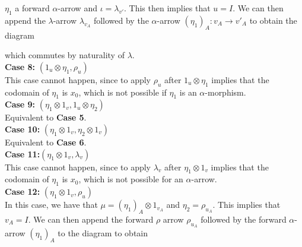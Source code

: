 \begin{varprf}
    $\eta_1$ a forward $\alpha$-arrow and $\iota = \lambda_{v'}$. 
    This then implies that $u = I$. 
    We can then append the $\lambda$-arrow $\lambda_{v_A}$ followed 
    by the $\alpha$-arrow $(\eta_1)_A: v_A \to v'_A$ to obtain the diagram
    \begin{center}
    \end{center}
    which commutes by naturality of $\lambda$. 
    \\
    \textbf{Case 8:} $(1_u \otimes \eta_1, \rho_u)$\\
    This case cannot happen, since to apply $\rho_u$ after $1_u \otimes \eta_1$  
    implies that the codomain of $\eta_1$ is $x_0$, which is not possible if $\eta_1$ 
    is an $\alpha$-morphism. 
    \\
    \textbf{Case 9:} $(\eta_1 \otimes 1_v, 1_u \otimes \eta_2)$\\
    Equivalent to \textbf{Case 5}.
    \\
    \textbf{Case 10:} $(\eta_1\otimes 1_v, \eta_2\otimes 1_v)$\\
    Equivalent to \textbf{Case 6}.
    \\
    \textbf{Case 11:}$(\eta_1 \otimes 1_v, \lambda_v)$\\
    This case cannot happen, since to apply $\lambda_v$ after 
    $\eta_1 \otimes 1_v$ implies that the codomain of $\eta_1$ is 
    $x_0$, which is not possible for an $\alpha$-arrow. 
    \\
    \textbf{Case 12:} $(\eta_1 \otimes 1_v, \rho_u)$\\
    In this case, we have that $\mu = (\eta_1)_A \otimes 1_{v_A}$ 
    and $\eta_2 = \rho_{u_A}$. This implies that 
    $v_A = I$. 
    We can then append the forward $\rho$ arrow $\rho_{u_A}$ followed 
    by the forward $\alpha$-arrow $(\eta_1)_A$ to the diagram to obtain 
    \begin{center}
        \begin{tikzcd}[column sep = 1.4cm, row sep = 1cm]

\end{tikzcd}
\end{center}
\end{varprf}
